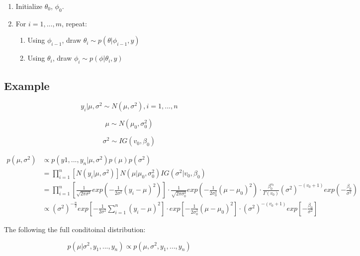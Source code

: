 \documentclass[]{book}
\providecommand{\tightlist}{%
  \setlength{\itemsep}{0pt}\setlength{\parskip}{0pt}}
\begin{document}
\begin{enumerate}
\def\labelenumi{(\arabic{enumi})}
\item
  Initialize \(\theta_0\), \(\phi_0\).
\item
  For \(i=1,..., m\), repeat:

  \begin{enumerate}
  \def\labelenumii{(\alph{enumii})}
  \tightlist
  \item
    Using \(\phi_{i-1}\), draw \(\theta_i \sim p(\theta|\phi_{i-1},y)\)
  \item
    Using \(\theta_i\), draw \(\phi_i \sim p(\phi|\theta_i,y)\)
  \end{enumerate}
\end{enumerate}

\hypertarget{example}{%
\subsection{Example}\label{example}}

\[y_i|\mu, \sigma^2 \sim N(\mu, \sigma^2),i = 1, ...,n\]

\[\mu \sim N(\mu_0,\sigma_0^2)\]

\[\sigma^2 \sim IG(v_0,\beta_0)\]

\[\begin{aligned} p(\mu, \sigma^2) &\propto p(y1,...,y_n| \mu, \sigma^2)p(\mu)p(\sigma^2) \\ &=\prod_{i=1}^n[N(y_i|\mu,\sigma^2)]N(\mu|\mu_0,\sigma_0^2)IG(\sigma^2|v_0,\beta_0)\\ &= \prod_{i=1}^n [\frac{1}{\sqrt{2\pi \sigma^2}} exp(-\frac{1}{2\sigma^2}(y_i-\mu)^2)] \cdot \frac{1}{\sqrt{2\pi \sigma_0^2}} exp(-\frac{1}{2\sigma_0^2}(\mu-\mu_0)^2) \cdot \frac{\beta_0^{v_0}}{\Gamma(v_0)}(\sigma^2)^{-(v_0+1)}exp(-\frac{\beta_0}{\sigma^2}) \\ &\propto (\sigma^2)^{-\frac{n}{2}}exp[-\frac{1}{2\sigma^2} \sum_{i=1}^n(y_i-\mu)^2] \cdot exp[-\frac{1}{2\sigma_0^2}(\mu-\mu_0)^2] \cdot (\sigma^2)^{-(v_0+1)}exp[-\frac{\beta_0}{\sigma^2}] \end{aligned}\]

The following the full conditoinal distribution:

\[p(\mu| \sigma^2, y_1,...,y_n) \propto p(\mu,\sigma^2,y_1,...,y_n)\]


\end{document}
